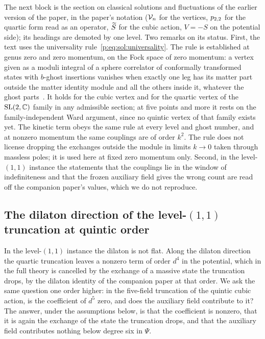 The next block is the section on classical solutions and fluctuations of the earlier version of the paper, in the paper's notation ($\mathcal{V}_{n}$ for the vertices, $p_{2,2}$ for the quartic form read as an operator, $\widetilde{S}_{}$ for the cubic action, $V = - S$ on the potential side); its headings are demoted by one level.
Two remarks on its status.
First, the text uses the universality rule~\eqref{p:eq:sol:universality}.
The rule is established at genus zero and zero momentum, on the Fock space of zero momentum: a vertex given as a moduli integral of a sphere correlator of conformally transformed states with $b$-ghost insertions vanishes when exactly one leg has its matter part outside the matter identity module and all the others inside it, whatever the ghost parts~\cite{Yang:2005:ClosedStringTachyon,Sen:1999:UniversalityTachyonPotential}.
It holds for the cubic vertex and for the quartic vertex of the $\mathrm{SL}(2, \mathbb{C})$ family in any admissible section; at five points and more it rests on the family-independent Ward argument, since no quintic vertex of that family exists yet.
The kinetic term obeys the same rule at every level and ghost number, and at nonzero momentum the same couplings are of order $k^2$.
The rule does not license dropping the exchanges outside the module in limits $k \to 0$ taken through massless poles; it is used here at fixed zero momentum only.
Second, in the level-$(1, 1)$ instance the statements that the couplings lie in the window of indefiniteness and that the frozen auxiliary field gives the wrong count are read off the companion paper's values, which we do not reproduce.



\subsection{The dilaton direction of the level-\texorpdfstring{$(1, 1)$}{(1,1)} truncation at quintic order}
\label{sec:sol:dilaton-d5}


In the level-$(1, 1)$ instance the dilaton is not flat.
Along the dilaton direction the quartic truncation leaves a nonzero term of order $d^4$ in the potential, which in the full theory is cancelled by the exchange of a massive state the truncation drops, by the dilaton identity of the companion paper at that order.
We ask the same question one order higher: in the five-field truncation of the quintic cubic action, is the coefficient of $d^5$ zero, and does the auxiliary field contribute to it?
The answer, under the assumptions below, is that the coefficient is nonzero, that it is again the exchange of the state the truncation drops, and that the auxiliary field contributes nothing below degree six in $\Psi$.

